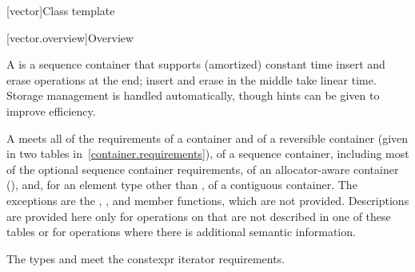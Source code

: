 [vector]{Class template }

[vector.overview]{Overview}

\pnum
{}%
A
is a sequence container that supports
(amortized) constant time insert and erase operations at the end;
insert and erase in the middle take linear time.
Storage management is handled automatically, though hints can be given
to improve efficiency.

\pnum
A  meets all of the requirements of a container and of a
reversible container (given in two tables in~\ref{container.requirements}), of a
sequence container, including most of the optional sequence container
requirements, of an allocator-aware container
(),
and, for an element type other than ,
of a contiguous container.
The exceptions are the
, , and  member functions, which are not
provided. Descriptions are provided here only for operations on 
that are not described in one of these tables or for operations where there is
additional semantic information.

\pnum
The types  and  meet
the constexpr iterator requirements.

